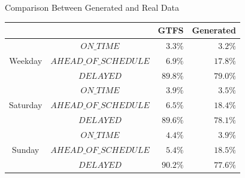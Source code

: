 \documentclass[xcolor=dvipsnames,table]{beamer}
\begin{document}
\begin{frame}{Comparison Between Generated and Real Data}
        \begin{table}[h!]
                \centering
                \begin{tabular}{|c|c|c|r|r|}
                        \hline
                        \multicolumn{3}{|c|}{} &   GTFS  &  Generated  \\
                        \hline
                        \multirow{3}{*}{Weekday} & \multicolumn{2}{|c|}{$ON\_TIME$} & $3.3\%$ & $3.2\%$ \\\cline{2-5}
                                                 & \multicolumn{2}{|c|}{$AHEAD\_OF\_SCHEDULE$} & $6.9\%$ & $17.8\%$ \\\cline{2-5}
                                                 & \multicolumn{2}{|c|}{$DELAYED$} &$89.8\%$ & $79.0\%$  \\
                                                 \hline
                        \multirow{3}{*}{Saturday} & \multicolumn{2}{|c|}{$ON\_TIME$} & $3.9\%$ & $3.5\%$ \\\cline{2-5}
                                                  & \multicolumn{2}{|c|}{$AHEAD\_OF\_SCHEDULE$} & $6.5\%$ & $18.4\%$ \\\cline{2-5}
                                                  & \multicolumn{2}{|c|}{$DELAYED$} &$89.6\%$ & $78.1\%$  \\
                                                  \hline
                        \multirow{3}{*}{Sunday} & \multicolumn{2}{|c|}{$ON\_TIME$} & $4.4\%$ & $3.9\%$ \\\cline{2-5}
                                                & \multicolumn{2}{|c|}{$AHEAD\_OF\_SCHEDULE$} & $5.4\%$ & $18.5\%$ \\\cline{2-5}
                                                & \multicolumn{2}{|c|}{$DELAYED$} &$90.2\%$ & $77.6\%$  \\
                                                \hline
                \end{tabular}
        \end{table}
\end{frame}
\end{document}
